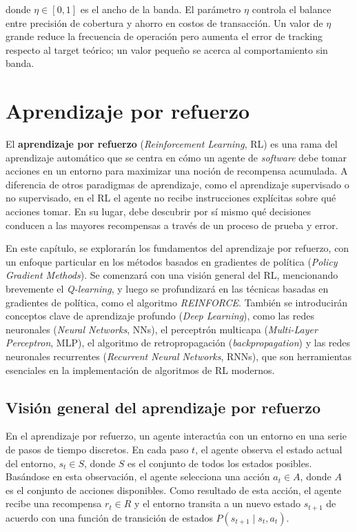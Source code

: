 \documentclass[11pt,a4paper,spanish]{article}
\numberwithin{equation}{section} %
\begin{document}
donde $\eta \in [0, 1]$ es el ancho de la banda. El parámetro $\eta$ controla el balance entre precisión de cobertura y ahorro en costos de transacción. Un valor de $\eta$ grande reduce la frecuencia de operación pero aumenta el error de tracking respecto al target teórico; un valor pequeño se acerca al comportamiento sin banda. 

\newpage


\section{Aprendizaje por refuerzo}\label{sec:rl}

El \textbf{aprendizaje por refuerzo} (\textit{Reinforcement Learning}, RL) es una rama del aprendizaje automático que se centra en cómo un agente de \textit{software} debe tomar acciones en un entorno para maximizar una noción de recompensa acumulada. A diferencia de otros paradigmas de aprendizaje, como el aprendizaje supervisado o no supervisado, en el RL el agente no recibe instrucciones explícitas sobre qué acciones tomar. En su lugar, debe descubrir por sí mismo qué decisiones conducen a las mayores recompensas a través de un proceso de prueba y error.

En este capítulo, se explorarán los fundamentos del aprendizaje por refuerzo, con un enfoque particular en los métodos basados en gradientes de política (\textit{Policy Gradient Methods}). Se comenzará con una visión general del RL, mencionando brevemente el \textit{Q-learning}, y luego se profundizará en las técnicas basadas en gradientes de política, como el algoritmo \textit{REINFORCE}. También se introducirán conceptos clave de aprendizaje profundo (\textit{Deep Learning}), como las redes neuronales (\textit{Neural Networks}, NNs), el perceptrón multicapa (\textit{Multi-Layer Perceptron}, MLP), el algoritmo de retropropagación (\textit{backpropagation}) y las redes neuronales recurrentes (\textit{Recurrent Neural Networks}, RNNs), que son herramientas esenciales en la implementación de algoritmos de RL modernos.

\subsection{Visión general del aprendizaje por refuerzo}

En el aprendizaje por refuerzo, un agente interactúa con un entorno en una serie de pasos de tiempo discretos. En cada paso $t$, el agente observa el estado actual del entorno, $s_t \in S$, donde $S$ es el conjunto de todos los estados posibles. Basándose en esta observación, el agente selecciona una acción $a_t \in A$, donde $A$ es el conjunto de acciones disponibles. Como resultado de esta acción, el agente recibe una recompensa $r_t \in R$ y el entorno transita a un nuevo estado $s_{t+1}$ de acuerdo con una función de transición de estados $P(s_{t+1} \mid s_t, a_t)$.
\end{document}
